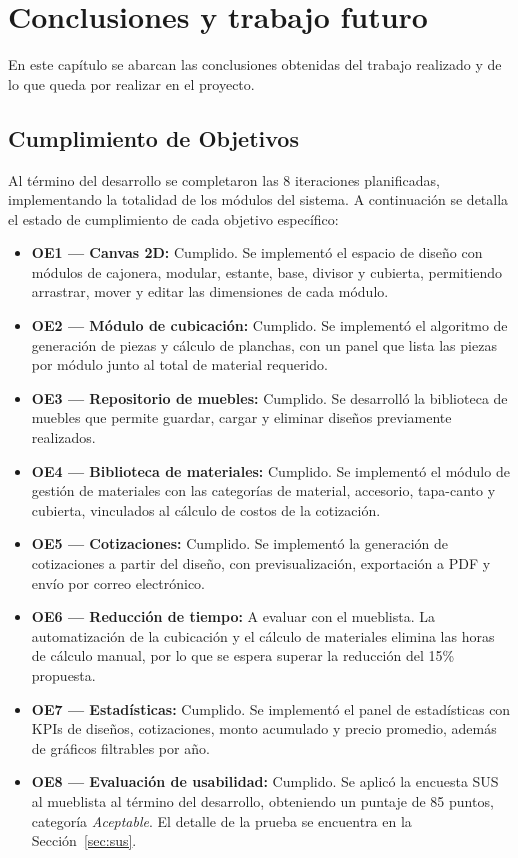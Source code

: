 ﻿\documentclass{iccmemoria}
\begin{document}
\chapter{Conclusiones y trabajo futuro}
En este capítulo se abarcan las conclusiones obtenidas del trabajo realizado y de lo que queda por realizar en el proyecto.



\section{Cumplimiento de Objetivos}
Al término del desarrollo se completaron las 8 iteraciones planificadas, implementando la totalidad de los módulos del sistema. A continuación se detalla el estado de cumplimiento de cada objetivo específico:

\begin{itemize}
    \item \textbf{OE1 — Canvas 2D:} Cumplido. Se implementó el espacio de diseño con módulos de cajonera, modular, estante, base, divisor y cubierta, permitiendo arrastrar, mover y editar las dimensiones de cada módulo.

    \item \textbf{OE2 — Módulo de cubicación:} Cumplido. Se implementó el algoritmo de generación de piezas y cálculo de planchas, con un panel que lista las piezas por módulo junto al total de material requerido.

    \item \textbf{OE3 — Repositorio de muebles:} Cumplido. Se desarrolló la biblioteca de muebles que permite guardar, cargar y eliminar diseños previamente realizados.

    \item \textbf{OE4 — Biblioteca de materiales:} Cumplido. Se implementó el módulo de gestión de materiales con las categorías de material, accesorio, tapa-canto y cubierta, vinculados al cálculo de costos de la cotización.

    \item \textbf{OE5 — Cotizaciones:} Cumplido. Se implementó la generación de cotizaciones a partir del diseño, con previsualización, exportación a PDF y envío por correo electrónico.

    \item \textbf{OE6 — Reducción de tiempo:} A evaluar con el mueblista. La automatización de la cubicación y el cálculo de materiales elimina las horas de cálculo manual, por lo que se espera superar la reducción del 15\% propuesta.

    \item \textbf{OE7 — Estadísticas:} Cumplido. Se implementó el panel de estadísticas con KPIs de diseños, cotizaciones, monto acumulado y precio promedio, además de gráficos filtrables por año.

    \item \textbf{OE8 — Evaluación de usabilidad:} Cumplido. Se aplicó la encuesta SUS al mueblista al término del desarrollo, obteniendo un puntaje de 85 puntos, categoría \textit{Aceptable}. El detalle de la prueba se encuentra en la Sección~\ref{sec:sus}.
\end{itemize}
\end{document}
